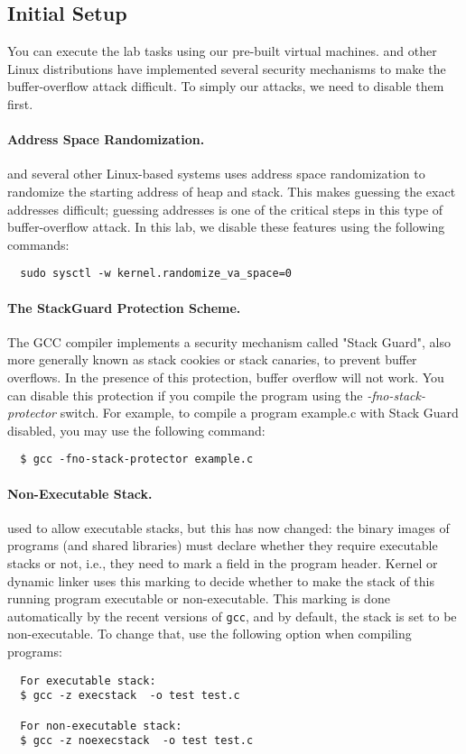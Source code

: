 \subsection{Initial Setup}


You can execute the lab tasks using our pre-built \ubuntu virtual machines.
\ubuntu and other Linux distributions have implemented several
security mechanisms to make the buffer-overflow attack difficult.
To simply our attacks, we need to disable them first.

\paragraph{Address Space Randomization.}
\ubuntu and several other Linux-based systems uses address space
randomization to randomize the starting address of heap and
stack. This makes guessing the exact addresses difficult; guessing
addresses is one of the critical steps in this type of buffer-overflow attack.  In
this lab, we disable these features using the following commands:

\begin{verbatim}
  sudo sysctl -w kernel.randomize_va_space=0
\end{verbatim}


\paragraph{The StackGuard Protection Scheme.}
The GCC compiler implements a security mechanism called
"Stack Guard", also more generally known as stack cookies or stack canaries, to prevent buffer overflows. In the presence of this
protection, buffer overflow will not work. You can disable this
protection if you compile the program using the
\emph{-fno-stack-protector} switch. For example, to compile a program
example.c with Stack Guard disabled, you may use the following command:
\begin{verbatim}
  $ gcc -fno-stack-protector example.c
\end{verbatim}


\paragraph{Non-Executable Stack.} \ubuntu used to allow executable stacks,
but this has now changed: the binary images of programs (and shared
libraries) must declare whether they require executable stacks or not,
i.e., they need to mark a field in the program header. Kernel or dynamic
linker uses this marking to decide whether to make the stack of this
running program executable or non-executable. This marking is done
automatically by the recent versions of {\tt gcc}, and by default, the
stack is set to be non-executable.  
To change that, use the following option when compiling programs:
\begin{verbatim}
  For executable stack:
  $ gcc -z execstack  -o test test.c

  For non-executable stack:
  $ gcc -z noexecstack  -o test test.c
\end{verbatim}


